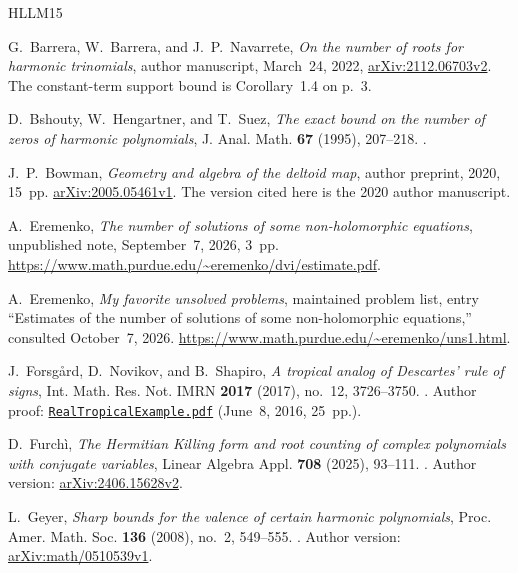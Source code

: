 \documentclass[UTF8,11pt]{ctexart}
\theoremstyle{definition}
\numberwithin{equation}{section}
\begin{document}
\clearpage
\begin{thebibliography}{HLLM15}
\raggedright

G.~Barrera, W.~Barrera, and J.~P.~Navarrete,
\emph{On the number of roots for harmonic trinomials},
author manuscript, March~24, 2022,
\href{https://arxiv.org/abs/2112.06703v2}{arXiv:2112.06703v2}.
The constant-term support bound is Corollary~1.4 on p.~3.

D.~Bshouty, W.~Hengartner, and T.~Suez,
\emph{The exact bound on the number of zeros of harmonic polynomials},
J. Anal. Math. \textbf{67} (1995), 207--218.
.

J.~P.~Bowman,
\emph{Geometry and algebra of the deltoid map},
author preprint, 2020, 15~pp.
\href{https://arxiv.org/abs/2005.05461v1}{arXiv:2005.05461v1}.
The version cited here is the 2020 author manuscript.

A.~Eremenko,
\emph{The number of solutions of some non-holomorphic equations},
unpublished note, September~7, 2026, 3~pp.
\url{https://www.math.purdue.edu/~eremenko/dvi/estimate.pdf}.

A.~Eremenko, \emph{My favorite unsolved problems}, maintained problem list,
entry ``Estimates of the number of solutions of some non-holomorphic
equations,'' consulted October~7, 2026.
\url{https://www.math.purdue.edu/~eremenko/uns1.html}.

J.~Forsg{\aa}rd, D.~Novikov, and B.~Shapiro,
\emph{A tropical analog of Descartes' rule of signs},
Int. Math. Res. Not. IMRN \textbf{2017} (2017), no.~12, 3726--3750.
.
Author proof: \href{https://staff.math.su.se/shapiro/Articles/RealTropicalExample.pdf}
{\texttt{RealTropicalExample.pdf}} (June~8, 2016, 25~pp.).

D.~Furch\`i,
\emph{The Hermitian Killing form and root counting of complex polynomials
with conjugate variables},
Linear Algebra Appl. \textbf{708} (2025), 93--111.
.
Author version: \href{https://arxiv.org/abs/2406.15628v2}{arXiv:2406.15628v2}.

L.~Geyer,
\emph{Sharp bounds for the valence of certain harmonic polynomials},
Proc. Amer. Math. Soc. \textbf{136} (2008), no.~2, 549--555.
.
Author version: \href{https://arxiv.org/abs/math/0510539v1}{arXiv:math/0510539v1}.


\end{thebibliography}
\end{document}
